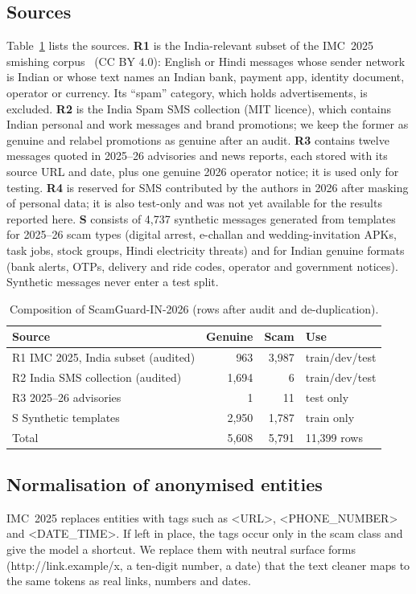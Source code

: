\documentclass[conference]{IEEEtran}
\renewcommand{\texttt}[1]{\textrm{#1}}  %
\begin{document}
\subsection{Sources}
Table~\ref{tab:data} lists the sources. \textbf{R1} is the India-relevant subset of the IMC~2025 smishing corpus~\cite{agarwal2025fishing} (CC BY 4.0): English or Hindi messages whose sender network is Indian or whose text names an Indian bank, payment app, identity document, operator or currency. Its ``spam'' category, which holds advertisements, is excluded. \textbf{R2} is the India Spam SMS collection (MIT licence), which contains Indian personal and work messages and brand promotions; we keep the former as genuine and relabel promotions as genuine after an audit. \textbf{R3} contains twelve messages quoted in 2025--26 advisories and news reports, each stored with its source URL and date, plus one genuine 2026 operator notice; it is used only for testing. \textbf{R4} is reserved for SMS contributed by the authors in 2026 after masking of personal data; it is also test-only and was not yet available for the results reported here. \textbf{S} consists of 4,737 synthetic messages generated from templates for 2025--26 scam types (digital arrest, e-challan and wedding-invitation APKs, task jobs, stock groups, Hindi electricity threats) and for Indian genuine formats (bank alerts, OTPs, delivery and ride codes, operator and government notices). Synthetic messages never enter a test split.

\begin{table}[t]
\centering
\caption{Composition of ScamGuard-IN-2026 (rows after audit and de-duplication).}
\label{tab:data}
\footnotesize
\begin{tabular}{@{}lrrl@{}}
\toprule
Source & Genuine & Scam & Use \\
\midrule
R1 IMC 2025, India subset (audited) & 963 & 3,987 & train/dev/test \\
R2 India SMS collection (audited) & 1,694 & 6 & train/dev/test \\
R3 2025--26 advisories & 1 & 11 & test only \\
S Synthetic templates & 2,950 & 1,787 & train only \\
\midrule
Total & 5,608 & 5,791 & 11,399 rows \\
\bottomrule
\end{tabular}
\end{table}

\subsection{Normalisation of anonymised entities}
IMC~2025 replaces entities with tags such as \textless URL\textgreater{}, \textless PHONE\_NUMBER\textgreater{} and \textless DATE\_TIME\textgreater{}. If left in place, the tags occur only in the scam class and give the model a shortcut. We replace them with neutral surface forms (\texttt{http://link.example/x}, a ten-digit number, a date) that the text cleaner maps to the same tokens as real links, numbers and dates.
\end{document}
